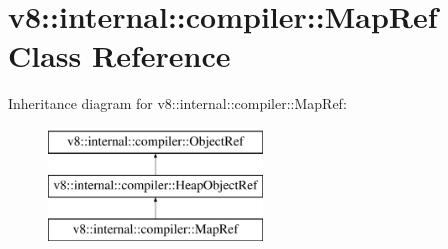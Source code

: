 \hypertarget{classv8_1_1internal_1_1compiler_1_1MapRef}{}\section{v8\+:\+:internal\+:\+:compiler\+:\+:Map\+Ref Class Reference}
\label{classv8_1_1internal_1_1compiler_1_1MapRef}
Inheritance diagram for v8\+:\+:internal\+:\+:compiler\+:\+:Map\+Ref\+:\begin{figure}[H]
\begin{center}
\leavevmode
\includegraphics[height=3.000000cm]{classv8_1_1internal_1_1compiler_1_1MapRef}
\end{center}
\end{figure}
